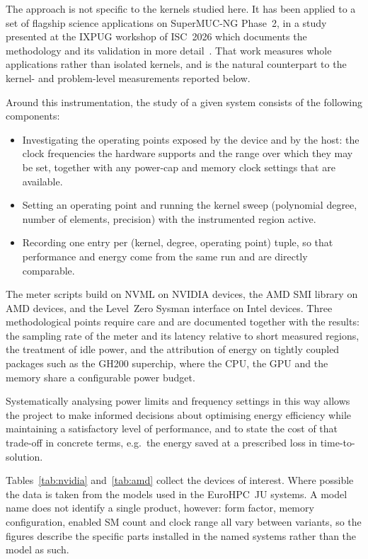The approach is not specific to the kernels studied here.
It has been applied to a set of flagship science applications on SuperMUC-NG Phase~2, in a study presented at the IXPUG workshop of ISC~2026 which documents the methodology and its validation in more detail~\citep{supermucng_energy_2026}.
That work measures whole applications rather than isolated kernels, and is the natural counterpart to the kernel- and problem-level measurements reported below.

Around this instrumentation, the study of a given system consists of the following components:
%
\begin{itemize}
    \item Investigating the operating points exposed by the device and by the host: the clock frequencies the hardware supports and the range over which they may be set, together with any power-cap and memory clock settings that are available.
    \item Setting an operating point and running the kernel sweep (polynomial degree, number of elements, precision) with the instrumented region active.
    \item Recording one entry per (kernel, degree, operating point) tuple, so that performance and energy come from the same run and are directly comparable.
\end{itemize}
%
The meter scripts build on NVML on NVIDIA devices, the AMD SMI library on AMD devices, and the Level~Zero Sysman interface on Intel devices.
Three methodological points require care and are documented together with the results: the sampling rate of the meter and its latency relative to short measured regions, the treatment of idle power, and the attribution of energy on tightly coupled packages such as the GH200 superchip, where the CPU, the GPU and the memory share a configurable power budget.

Systematically analysing power limits and frequency settings in this way allows the project to make informed decisions about optimising energy efficiency while maintaining a satisfactory level of performance, and to state the cost of that trade-off in concrete terms, e.g.\ the energy saved at a prescribed loss in time-to-solution.

Tables~\ref{tab:nvidia} and~\ref{tab:amd} collect the devices of interest.
Where possible the data is taken from the models used in the EuroHPC~JU systems.
A model name does not identify a single product, however: form factor, memory configuration, enabled SM count and clock range all vary between variants, so the figures describe the specific parts installed in the named systems rather than the model as such.

